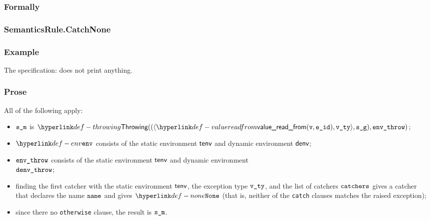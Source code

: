 \subsubsection{Formally}
\begin{mathpar}
\end{mathpar}

\subsubsection{SemanticsRule.CatchNone\label{sec:SemanticsRule.CatchNone}}
\subsubsection{Example}
The specification:
does not print anything.

\subsubsection{Prose}
All of the following apply:
\begin{itemize}
  \item $\sm$ is $\Throwing((\langle \valuereadfrom(\vv, \eid), \vvty \rangle, \sg), \envthrow)$;
  \item $\env$ consists of the static environment $\tenv$ and dynamic environment $\denv$;
  \item $\envthrow$ consists of the static environment $\tenv$ and dynamic environment \\ $\denvthrow$;
  \item finding the first catcher with the static environment $\tenv$, the exception type $\vvty$,
  and the list of catchers $\catchers$ gives a catcher that declares the name $\name$ and gives $\None$
  (that is, neither of the \texttt{catch} clauses matches the raised exception);
  \item since there no \texttt{otherwise} clause, the result is $\sm$.
\end{itemize}
